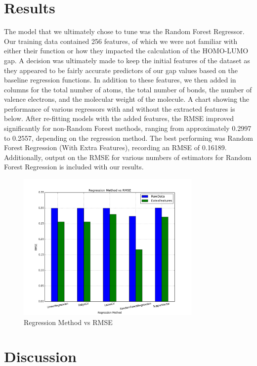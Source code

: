 \documentclass{article}
\begin{document}
\section{Results}
The model that we ultimately chose to tune was the Random Forest Regressor. Our training data contained 256 features, of which we were not familiar with either their function or how they impacted the calculation of the HOMO-LUMO gap. A decision was ultimately made to keep the initial features of the dataset as they appeared to be fairly accurate predictors of our gap values based on the baseline regression functions. In addition to these features, we then added in columns for the total number of atoms, the total number of bonds, the number of valence electrons, and the molecular weight of the molecule. A chart showing the performance of various regressors with and without the extracted features is below. After re-fitting models with the added features, the RMSE improved significantly for non-Random Forest methods, ranging from approximately 0.2997 to 0.2557, depending on the regression method. The best performing was Random Forest Regression (With Extra Features), recording an RMSE of 0.16189.  Additionally, output on the RMSE for various numbers of estimators for Random Forest Regression is included with our results. 
\begin{figure}[h]
\centering
\includegraphics[width=0.8\textwidth]{method_selection}
\caption{Regression Method vs RMSE}
\label{fig:method_selection}
\end{figure}

\section{Discussion}
\end{document}
